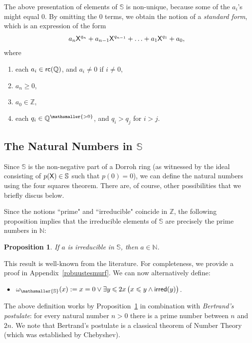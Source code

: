 \documentclass{amsart}
\renewcommand{\leq}{\leqslant}
\renewcommand{\geq}{\geqslant}
\newtheorem{prop}[theorem]{Proposition}
\newcommand{\bleq}{\mathbin{\leq}}
\newcommand{\X}{{\sf X}}
\newcommand{\irred}{{\sf irred}}
\newcommand{\mbbs}[1]{\ensuremath{\mathsmaller{\mathbb{#1}}}}
\newcommand{\rc}{{\sf rc}}
\begin{document}
The above presentation of elements of $\mathbb{S}$ is non-unique, because some of the $a_i$'s might equal $0$. By omitting the $0$ terms, 
we obtain the notion of a \textit{standard form}, which is an expression of the form
\[a_{n}\X^{q_n} + a_{n-1}\X^{q_{n-1}} + \ldots + a_1\X^{q_1} + a_0,\]
where

\begin{enumerate}[$1$.]
    \item each $a_i\in \rc(\mathbb{Q})$, and $a_i\neq 0$ if $i\neq 0$,
    \item $a_n \geq 0$,  
    \item $a_0\in\mathbb{Z}$, 
    \item each $q_i\in\mathbb{Q}^{\mathsmaller{> 0}}$, and  $q_i>q_j$ for $i>j$.    
\end{enumerate}


\subsection{The Natural Numbers in $\mathbb S$}
Since $\mathbb S$ is the non-negative part of a Dorroh ring (as witnessed by the ideal consisting of $p(\X)\in\mathbb{S}$ 
such that $p(0)=0$), we can define the natural numbers using the four squares theorem.
There are, of course, other possibilities that we briefly discus below.

Since the notions ``prime" and ``irreducible" coincide in $\mathbb{Z}$, the following proposition implies that the irreducible elements of $\mathbb{S}$ are precisely the prime numbers in $\mathbb{N}$: 
\begin{prop}\label{nijveresmurf}
    If $a$ is irreducible in $\mathbb{S}$, then $a\in \mathbb{N}$.
\end{prop}

This result is well-known from the literature. For completeness, we provide a proof in Appendix~\ref{robuustesmurf}.
We can now alternatively define:
\begin{itemize}
    \item
$\omega_{\mbbs{S}}(x):= x=0 \vee \exists y \bleq 2x\,
    \bigl(x\leq y \wedge \irred(y)\bigr)$.
    \end{itemize}
    
    \noindent
    The above definition works by Proposition~\ref{nijveresmurf} in combination with \emph{Bertrand's postulate}: for
    every natural number $n>0$ there is a prime number between $n$ and $2n$. 
    We note that Bertrand's postulate is a classical theorem of Number Theory (which was established by Chebyshev).
\end{document}
